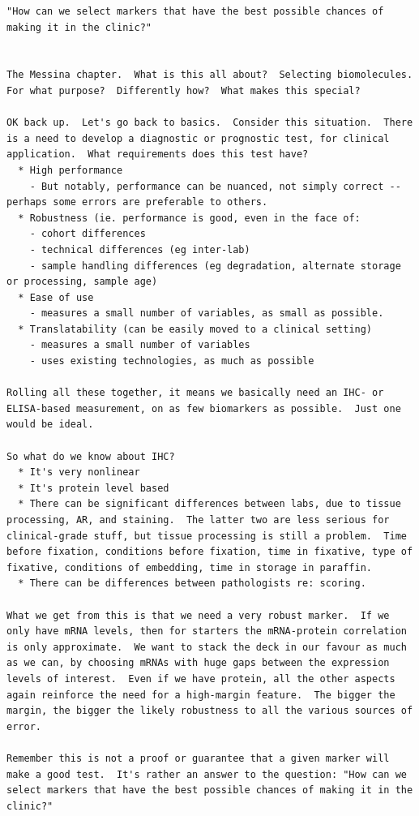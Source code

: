 \documentclass[dissertation.tex]{subfiles}
\begin{document}
\begin{verbatim}
"How can we select markers that have the best possible chances of making it in the clinic?"


The Messina chapter.  What is this all about?  Selecting biomolecules.  For what purpose?  Differently how?  What makes this special?

OK back up.  Let's go back to basics.  Consider this situation.  There is a need to develop a diagnostic or prognostic test, for clinical application.  What requirements does this test have?
  * High performance
    - But notably, performance can be nuanced, not simply correct -- perhaps some errors are preferable to others.
  * Robustness (ie. performance is good, even in the face of:
    - cohort differences
    - technical differences (eg inter-lab)
    - sample handling differences (eg degradation, alternate storage or processing, sample age)
  * Ease of use
    - measures a small number of variables, as small as possible.
  * Translatability (can be easily moved to a clinical setting)
    - measures a small number of variables
    - uses existing technologies, as much as possible

Rolling all these together, it means we basically need an IHC- or ELISA-based measurement, on as few biomarkers as possible.  Just one would be ideal.

So what do we know about IHC?
  * It's very nonlinear
  * It's protein level based
  * There can be significant differences between labs, due to tissue processing, AR, and staining.  The latter two are less serious for clinical-grade stuff, but tissue processing is still a problem.  Time before fixation, conditions before fixation, time in fixative, type of fixative, conditions of embedding, time in storage in paraffin.
  * There can be differences between pathologists re: scoring.

What we get from this is that we need a very robust marker.  If we only have mRNA levels, then for starters the mRNA-protein correlation is only approximate.  We want to stack the deck in our favour as much as we can, by choosing mRNAs with huge gaps between the expression levels of interest.  Even if we have protein, all the other aspects again reinforce the need for a high-margin feature.  The bigger the margin, the bigger the likely robustness to all the various sources of error.

Remember this is not a proof or guarantee that a given marker will make a good test.  It's rather an answer to the question: "How can we select markers that have the best possible chances of making it in the clinic?"



\end{verbatim}
\end{document}
